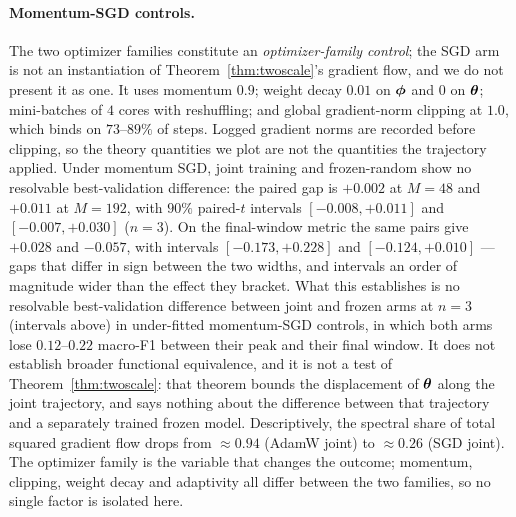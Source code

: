 \paragraph{Momentum-SGD controls.}
The two optimizer families constitute an \emph{optimizer-family
control}; the SGD arm is not an instantiation of
Theorem~\ref{thm:twoscale}'s gradient flow, and we do not present it as
one. It uses momentum $0.9$; weight decay $0.01$ on ${\boldsymbol{\phi}}$ and $0$ on
${\boldsymbol{\theta}}$; mini-batches of $4$ cores with reshuffling; and global
gradient-norm clipping at $1.0$, which binds on $73$--$89\%$ of steps.
Logged gradient norms are recorded before clipping, so the theory
quantities we plot are not the quantities the trajectory applied.
Under momentum SGD, joint training and frozen-random show no resolvable
best-validation difference: the paired gap is $+0.002$ at $M{=}48$ and
$+0.011$ at $M{=}192$, with $90\%$ paired-$t$ intervals
$[-0.008, +0.011]$ and $[-0.007, +0.030]$ ($n=3$). On the final-window
metric the same pairs give $+0.028$ and $-0.057$, with intervals
$[-0.173, +0.228]$ and $[-0.124, +0.010]$ --- gaps that differ in sign
between the two widths, and intervals an order of magnitude wider than
the effect they bracket. What this establishes is no resolvable
best-validation difference between joint and frozen arms at $n=3$
(intervals above) in under-fitted momentum-SGD controls, in which both
arms lose $0.12$--$0.22$ macro-F1 between their peak and their final
window. It does not establish broader functional equivalence, and it is
not a test of
Theorem~\ref{thm:twoscale}: that theorem bounds the displacement of
${\boldsymbol{\theta}}$ along the joint trajectory, and says nothing about the
difference between that trajectory and a separately trained frozen
model. Descriptively, the spectral share of total squared gradient flow
drops from $\approx 0.94$ (AdamW joint) to $\approx 0.26$ (SGD joint).
The optimizer family is the variable that changes the outcome;
momentum, clipping, weight decay and adaptivity all differ between the
two families, so no single factor is isolated here.

